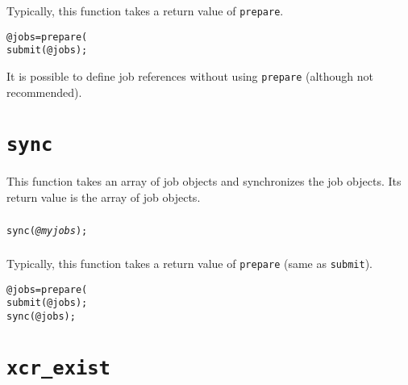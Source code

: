 \documentclass[a4paper,10pt]{report}
\begin{document}
\subsubsection{\example}
Typically, this function takes a return value of \texttt{prepare}.
\begin{boxnote}
\begin{alltt}
@jobs = prepare(%mytemplate);
submit(@jobs);
\end{alltt}
\end{boxnote}
\vspace{\baselineskip}
It is possible to define job references without using
\texttt{prepare} (although not recommended).

\section{\texttt{sync}}

This function takes an array of job objects and synchronizes the job objects.
Its return value is the array of job objects.

\subsubsection{\format}

\begin{boxnote}
\begin{alltt}
sync(\textit{@myjobs});
\end{alltt}
\end{boxnote}
\vspace{\baselineskip}

\subsubsection{\example}

Typically, this function takes a return value of \texttt{prepare}
(same as \texttt{submit}).
\begin{boxnote}
\begin{alltt}
@jobs = prepare(%mytemplate);
submit(@jobs);
sync(@jobs);
\end{alltt}
\end{boxnote}
\vspace{\baselineskip}

\section{\texttt{xcr\_exist}}
\end{document}
